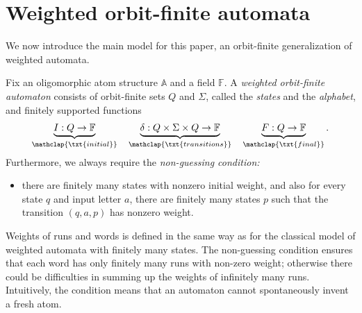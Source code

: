 \documentclass{theoretics}
\newcommand{\myunderbrace}[2]{\underbrace{#1}_{\mathclap{\txt{\scriptsize #2}}}}
\newcommand{\atoms}{\mathbb A}
\newcommand{\field}{\mathbb F}
\begin{document}
\section{Weighted orbit-finite automata}\label{sec:wof-aut}
We now introduce the main model for this paper, an orbit-finite generalization of weighted automata.
\begin{definition}\label{def:weighted-orbit-finite} 
Fix an oligomorphic atom structure $\atoms$ and a field $\field$. 
    A \emph{weighted orbit-finite automaton} consists of orbit-finite sets $Q$ and $\Sigma$, called the \emph{states} and the {\em alphabet}, and finitely supported functions 
    \begin{align*}
        \myunderbrace{I : Q \to \field}{initial} 
        \quad 
        \myunderbrace{\delta : Q \times \Sigma \times Q \to \field}{transitions}
        \quad 
        \myunderbrace{F : Q \to \field}{final}.
    \end{align*}
    Furthermore, we always require the \emph{non-guessing condition:}
    \begin{itemize}
    \item[(*)]
        there are finitely many states with nonzero initial weight, and also for every state $q$ and input letter $a$, there are finitely many states $p$ such that the transition $(q,a,p)$ has nonzero weight.
    \end{itemize}
\end{definition}

Weights of runs and  words is defined in the same way as for the classical model of weighted automata with finitely many states. 
The non-guessing condition ensures that each word has only finitely many runs with non-zero weight; otherwise there could be difficulties in summing up the weights of infinitely many runs. Intuitively, the condition means that an automaton cannot spontaneously invent a fresh atom. 
\end{document}
